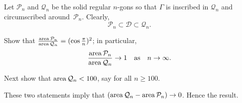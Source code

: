 Let $\mathcal{P}_n$ and $\mathcal{Q}_n$ be the solid regular $n$-gons
so that $\Gamma$ is inscribed in $\mathcal{Q}_n$ and circumscribed around~$\mathcal{P}_n$.
Clearly,
\[\mathcal{P}_n\subset\mathcal{D}\subset\mathcal{Q}_n.\]

Show that 
$\tfrac{\mathop{\rm area}\nolimits\mathcal{P}_n}{\mathop{\rm area}\nolimits\mathcal{Q}_n}=(\cos\tfrac\pi n)^2$;
in particular, 
$$\frac{\mathop{\rm area}\nolimits\mathcal{P}_n}{\mathop{\rm area}\nolimits\mathcal{Q}_n}\to 1
\quad
\text{as}
\quad
n\to\infty.$$

Next show that $\mathop{\rm area}\nolimits\mathcal{Q}_n<100$, say for all $n\ge 100$.

These two statements imply that
$(\mathop{\rm area}\nolimits\mathcal{Q}_n-\mathop{\rm area}\nolimits\mathcal{P}_n)\to 0$.
Hence the result.

